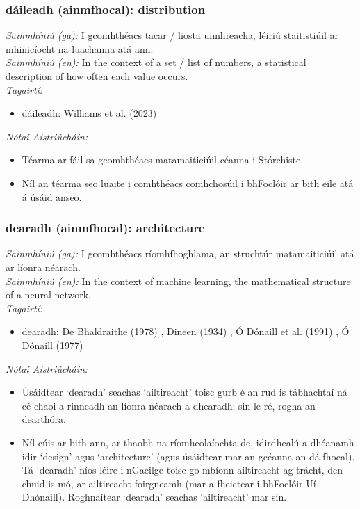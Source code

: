 \subsubsection*{dáileadh (ainmfhocal): distribution}
 \noindent \textit{Sainmhíniú (ga):} I gcomhthéacs tacar / liosta uimhreacha, léiriú staitistiúil ar mhinicíocht na luachanna atá ann.
\\
 \noindent \textit{Sainmhíniú (en):} In the context of a set / list of numbers, a statistical description of how often each value occurs.
\\
 \noindent \textit{Tagairtí:}
\begin{itemize}
	\item dáileadh: Williams et al. (2023) \cite{storchiste}
\end{itemize}

 \noindent \textit{Nótaí Aistriúcháin:}
\begin{itemize}
	\item Téarma ar fáil sa gcomhthéacs matamaiticiúil céanna i Stórchiste.
	\item Níl an téarma seo luaite i comhthéacs comhchosúil i bhFoclóir ar bith eile atá á úsáid anseo.
\end{itemize}


\subsubsection*{dearadh (ainmfhocal): architecture}
 \noindent \textit{Sainmhíniú (ga):} I gcomhthéacs ríomhfhoghlama, an struchtúr matamaiticiúil atá ar líonra néarach.
\\
 \noindent \textit{Sainmhíniú (en):} In the context of machine learning, the mathematical structure of a neural network.
\\
 \noindent \textit{Tagairtí:}
\begin{itemize}
	\item dearadh: De Bhaldraithe (1978) \cite{de-bhaldraithe}, Dineen (1934) \cite{dineen}, Ó Dónaill et al. (1991) \cite{focloir-beag}, Ó Dónaill (1977) \cite{odonaill}
\end{itemize}

 \noindent \textit{Nótaí Aistriúcháin:}
\begin{itemize}
	\item Úsáidtear `dearadh' seachas `ailtireacht' toisc gurb é an rud is tábhachtaí ná cé chaoi a rinneadh an líonra néarach a dhearadh; sin le ré, rogha an dearthóra.
	\item Níl cúis ar bith ann, ar thaobh na ríomheolaíochta de, idirdhealú a dhéanamh idir `design' agus `architecture' (agus úsáidtear mar an gcéanna an dá fhocal). Tá `dearadh' níos léire i nGaeilge toisc go mbíonn ailtireacht ag trácht, den chuid is mó, ar ailtireacht foirgneamh (mar a fheictear i bhFoclóir Uí Dhónaill). Roghnaítear `dearadh' seachas `ailtireacht' mar sin.
\end{itemize}


